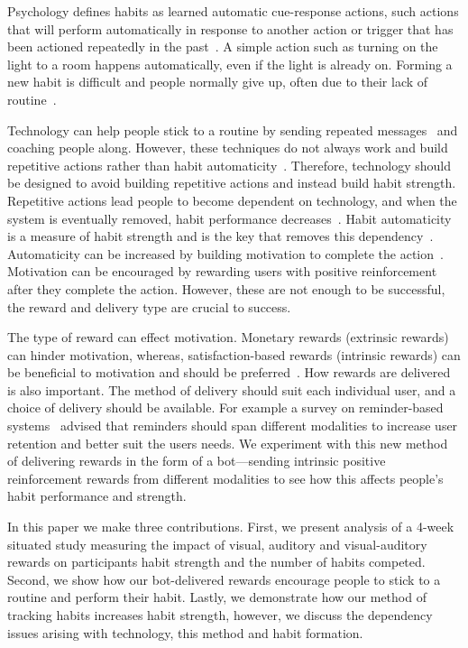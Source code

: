 \documentclass{scaffold/sigchi}
\begin{document}
Psychology defines habits as learned automatic cue-response actions, such actions that will perform automatically in response to another action or trigger that has been actioned repeatedly in the past~\cite{article_the_habitual_consumer}. A simple action such as turning on the light to a room happens automatically, even if the light is already on. Forming a new habit is difficult and people normally give up, often due to their lack of routine~\cite{article_promoting_habit_formation, article_the_habitual_consumer}.

Technology can help people stick to a routine by sending repeated messages~\cite{chi_crowd_designed_motivation} and coaching people along. However, these techniques do not always work and build repetitive actions rather than habit automaticity~\cite{coaching_not_that_good}. Therefore, technology should be designed to avoid building repetitive actions and instead build habit strength. Repetitive actions lead people to become dependent on technology, and when the system is eventually removed, habit performance decreases~\cite{article_dont_kick_habit}. Habit automaticity is a measure of habit strength and is the key that removes this dependency~\cite{article_beyond_self_tracking_designing_apps}. Automaticity can be increased by building motivation to complete the action~\cite{article_a_self_efficacy, article_meta_analytic_review_intrinsic_motivation}.
Motivation can be encouraged by rewarding users with positive reinforcement after they complete the action.
However, these are not enough to be successful, the reward and delivery type are crucial to success.

The type of reward can effect motivation. Monetary rewards (extrinsic rewards) can hinder motivation, whereas, satisfaction-based rewards (intrinsic rewards) can be beneficial to motivation and should be preferred~\cite{article_meta_analytic_review_intrinsic_motivation}.
How rewards are delivered is also important. The method of delivery should suit each individual user, and a choice of delivery should be available. For example a survey on reminder-based systems~\cite{article_user_centred_multimodal_reminders} advised that reminders should span different modalities to increase user retention and better suit the users needs.
We experiment with this new method of delivering rewards in the form of a bot---sending intrinsic positive reinforcement rewards from different modalities to see how this affects people's habit performance and strength.

In this paper we make three contributions. First, we present analysis of a 4-week situated study measuring the impact of visual, auditory and visual-auditory rewards on participants habit strength and the number of habits competed. Second, we show how our bot-delivered rewards encourage people to stick to a routine and perform their habit. Lastly, we demonstrate how our method of tracking habits increases habit strength, however, we discuss the dependency issues arising with technology, this method and habit formation.
\end{document}
